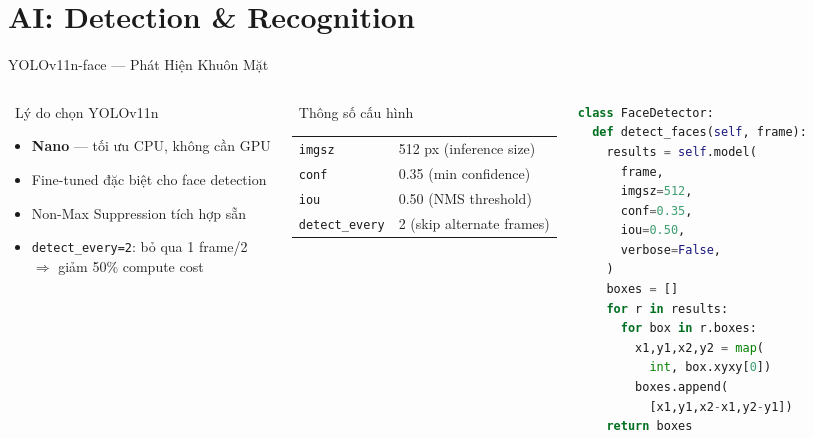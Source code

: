\documentclass[aspectratio=169, 11pt]{beamer}
\begin{document}
\section{AI: Detection \& Recognition}

\begin{frame}[fragile]{YOLOv11n-face --- Phát Hiện Khuôn Mặt}
\begin{columns}[T]
\begin{block}{\faThumbsUp\ Lý do chọn YOLOv11n}
\begin{itemize}\footnotesize
  \item \textbf{Nano} --- tối ưu CPU, không cần GPU
  \item Fine-tuned đặc biệt cho face detection
  \item Non-Max Suppression tích hợp sẵn
  \item \texttt{detect\_every=2}: bỏ qua 1 frame/2\\
        $\Rightarrow$ giảm 50\% compute cost
\end{itemize}
\end{block}
\begin{block}{\faCogs\ Thông số cấu hình}
\footnotesize
\begin{tabular}{ll}
\texttt{imgsz}  & 512 px (inference size) \\
\texttt{conf}   & 0.35 (min confidence) \\
\texttt{iou}    & 0.50 (NMS threshold) \\
\texttt{detect\_every} & 2 (skip alternate frames) \\
\end{tabular}
\end{block}
\begin{lstlisting}[language=Python, caption={detector.py}]
class FaceDetector:
  def detect_faces(self, frame):
    results = self.model(
      frame,
      imgsz=512,
      conf=0.35,
      iou=0.50,
      verbose=False,
    )
    boxes = []
    for r in results:
      for box in r.boxes:
        x1,y1,x2,y2 = map(
          int, box.xyxy[0])
        boxes.append(
          [x1,y1,x2-x1,y2-y1])
    return boxes
\end{lstlisting}
\end{columns}
\end{frame}
\end{document}
